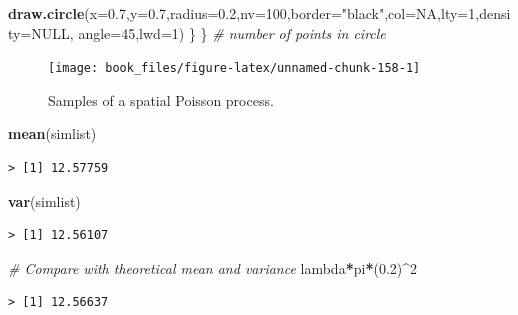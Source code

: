 \documentclass[b5paper,]{scrbook}
\makeatletter
\newenvironment{Shaded}{\begin{snugshade}}{\end{snugshade}}
\newcommand{\CommentTok}[1]{\textcolor[rgb]{0.56,0.35,0.01}{\textit{#1}}}
\newcommand{\DataTypeTok}[1]{\textcolor[rgb]{0.13,0.29,0.53}{#1}}
\newcommand{\DecValTok}[1]{\textcolor[rgb]{0.00,0.00,0.81}{#1}}
\newcommand{\FloatTok}[1]{\textcolor[rgb]{0.00,0.00,0.81}{#1}}
\newcommand{\KeywordTok}[1]{\textcolor[rgb]{0.13,0.29,0.53}{\textbf{#1}}}
\newcommand{\NormalTok}[1]{#1}
\newcommand{\OperatorTok}[1]{\textcolor[rgb]{0.81,0.36,0.00}{\textbf{#1}}}
\newcommand{\OtherTok}[1]{\textcolor[rgb]{0.56,0.35,0.01}{#1}}
\newcommand{\StringTok}[1]{\textcolor[rgb]{0.31,0.60,0.02}{#1}}
\theoremstyle{plain}
\theoremstyle{definition}
\numberwithin{equation}{section}
\newenvironment{kframe}{%
\medskip{}
\setlength{\fboxsep}{.8em}
 \def\at@end@of@kframe{}%
 \ifinner\ifhmode%
  \def\at@end@of@kframe{\end{minipage}}%
  \begin{minipage}{\columnwidth}%
 \fi\fi%
 \def\FrameCommand##1{\hskip\@totalleftmargin \hskip-\fboxsep
 \colorbox{shadecolor}{##1}\hskip-\fboxsep
     \hskip-\linewidth \hskip-\@totalleftmargin \hskip\columnwidth}%
 \MakeFramed {\advance\hsize-\width
   \@totalleftmargin\z@ \linewidth\hsize
   \@setminipage}}%
 {\par\unskip\endMakeFramed%
 \at@end@of@kframe}
\renewenvironment{Shaded}{\begin{kframe}}{\end{kframe}}
\makeatother
\begin{document}
\begin{Shaded}
\begin{Highlighting}[]
    \KeywordTok{draw.circle}\NormalTok{(}\DataTypeTok{x=}\FloatTok{0.7}\NormalTok{,}\DataTypeTok{y=}\FloatTok{0.7}\NormalTok{,}\DataTypeTok{radius=}\FloatTok{0.2}\NormalTok{,}\DataTypeTok{nv=}\DecValTok{100}\NormalTok{,}\DataTypeTok{border=}\StringTok{"black"}\NormalTok{,}\DataTypeTok{col=}\OtherTok{NA}\NormalTok{,}\DataTypeTok{lty=}\DecValTok{1}\NormalTok{,}\DataTypeTok{density=}\OtherTok{NULL}\NormalTok{,}
                \DataTypeTok{angle=}\DecValTok{45}\NormalTok{,}\DataTypeTok{lwd=}\DecValTok{1}\NormalTok{)}
\NormalTok{  \}}
\NormalTok{\} }\CommentTok{# number of points in circle}
\end{Highlighting}
\end{Shaded}

\begin{figure}

{\centering \texttt{[image: book\_files/figure-latex/unnamed-chunk-158-1]} 

}

\caption{Samples of a spatial Poisson process.}\label{fig:unnamed-chunk-158}
\end{figure}

\begin{Shaded}
\begin{Highlighting}[]
\KeywordTok{mean}\NormalTok{(simlist)}
\end{Highlighting}
\end{Shaded}

\begin{verbatim}
> [1] 12.57759
\end{verbatim}

\begin{Shaded}
\begin{Highlighting}[]
\KeywordTok{var}\NormalTok{(simlist)}
\end{Highlighting}
\end{Shaded}

\begin{verbatim}
> [1] 12.56107
\end{verbatim}

\begin{Shaded}
\begin{Highlighting}[]
\CommentTok{# Compare with theoretical mean and variance}
\NormalTok{lambda}\OperatorTok{*}\NormalTok{pi}\OperatorTok{*}\NormalTok{(}\FloatTok{0.2}\NormalTok{)}\OperatorTok{^}\DecValTok{2}
\end{Highlighting}
\end{Shaded}

\begin{verbatim}
> [1] 12.56637
\end{verbatim}
\end{document}
